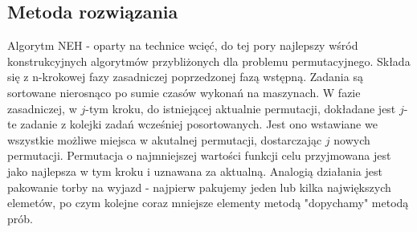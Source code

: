 	\subsection{Metoda rozwiązania}
	Algorytm NEH - oparty na technice wcięć, do tej pory najlepszy wśród konstrukcyjnych algorytmów przybliżonych dla problemu permutacyjnego. Składa się z n-krokowej fazy zasadniczej poprzedzonej fazą wstępną. Zadania są sortowane nierosnąco po sumie czasów wykonań na maszynach. W fazie zasadniczej, w $j$-tym kroku, do istniejącej aktualnie permutacji, dokładane jest $j$-te zadanie z kolejki zadań wcześniej posortowanych. Jest ono wstawiane we wszystkie możliwe miejsca w akutalnej permutacji, dostarczając $j$ nowych permutacji. Permutacja o najmniejszej wartości funkcji celu przyjmowana jest jako najlepsza w tym kroku i uznawana za aktualną. 
	Analogią działania jest pakowanie torby na wyjazd - najpierw pakujemy jeden lub kilka największych elemetów, po czym kolejne coraz mniejsze elementy metodą "dopychamy" metodą prób.